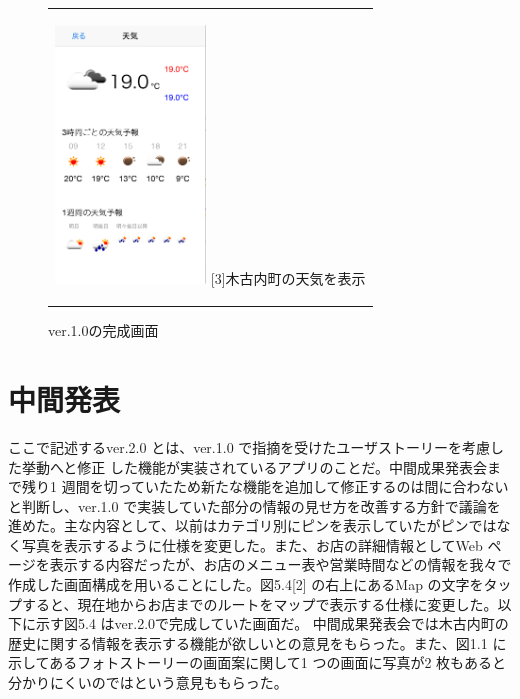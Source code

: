 \documentclass[openany,11pt,papersize]{jsbook}
\begin{document}
\begin{figure}[htbp]
\begin{center}
\begin{tabular}{c}
      \begin{minipage}{0.33\hsize}
        \begin{center}
\includegraphics[width=4cm, bb=0 0 320 549]{5.3_weather.png}
          \hspace{1cm} [3]木古内町の天気を表示
        \end{center}
      \end{minipage}

    \end{tabular}
    \caption{ver.1.0の完成画面}
    \label{fig:lena}
  \end{center}
\end{figure}

\section{中間発表}
ここで記述するver.2.0 とは、ver.1.0 で指摘を受けたユーザストーリーを考慮した挙動へと修正
した機能が実装されているアプリのことだ。中間成果発表会まで残り1 週間を切っていたため新たな機能を追加して修正するのは間に合わないと判断し、ver.1.0 で実装していた部分の情報の見せ方を改善する方針で議論を進めた。主な内容として、以前はカテゴリ別にピンを表示していたがピンではなく写真を表示するように仕様を変更した。また、お店の詳細情報としてWeb ページを表示する内容だったが、お店のメニュー表や営業時間などの情報を我々で作成した画面構成を用いることにした。図5.4[2] の右上にあるMap の文字をタップすると、現在地からお店までのルートをマップで表示する仕様に変更した。以下に示す図5.4 はver.2.0で完成していた画面だ。
中間成果発表会では木古内町の歴史に関する情報を表示する機能が欲しいとの意見をもらった。また、図1.1 に示してあるフォトストーリーの画面案に関して1 つの画面に写真が2 枚もあると分かりにくいのではという意見ももらった。
\end{document}
